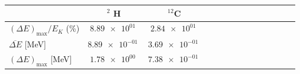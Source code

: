 \begin{tabular}{lccccccccccccc}
\toprule
 & $^2$ H & $^{12}$C \\
\midrule
$(\Delta E)_{\max}/E_K$ (\%) & $\SI{8.89e+01}{}$ & $\SI{2.84e+01}{}$ \\
$\overline{\Delta E}$ [MeV] & $\SI{8.89e-01}{}$ & $\SI{3.69e-01}{}$ \\
$(\Delta E)_{\max}$ [MeV] & $\SI{1.78e+00}{}$ & $\SI{7.38e-01}{}$ \\
\bottomrule
\end{tabular}
